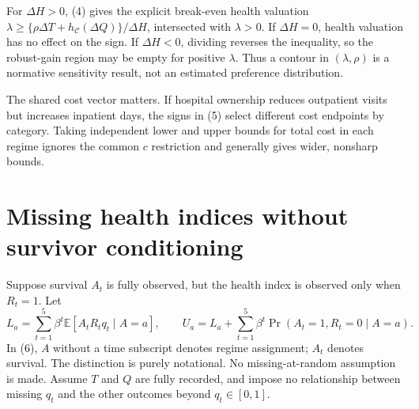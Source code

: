 \documentclass[11pt]{article}
\theoremstyle{remark}
\newcommand{\E}{\mathbb E}
\begin{document}
For $\Delta H>0$, (4) gives the explicit break-even health valuation
$\lambda\geq\{\rho\Delta T+h_{\mathcal C}(\Delta Q)\}/\Delta H$,
intersected with $\lambda>0$. If $\Delta H=0$, health valuation has no effect on the sign. If $\Delta H<0$, dividing reverses the inequality, so the robust-gain region may be empty for positive $\lambda$. Thus a contour in $(\lambda,\rho)$ is a normative sensitivity result, not an estimated preference distribution.

The shared cost vector matters. If hospital ownership reduces outpatient visits but increases inpatient days, the signs in (5) select different cost endpoints by category. Taking independent lower and upper bounds for total cost in each regime ignores the common $c$ restriction and generally gives wider, nonsharp bounds.

\section{Missing health indices without survivor conditioning}
Suppose survival $A_t$ is fully observed, but the health index is observed only when $R_t=1$. Let
\[
 L_a=\sum_{t=1}^5\beta^t\E[A_tR_tq_t\mid A=a],\qquad
 U_a=L_a+\sum_{t=1}^5\beta^t\Pr(A_t=1,R_t=0\mid A=a).     \tag{6}
\]
In (6), $A$ without a time subscript denotes regime assignment; $A_t$ denotes survival. The distinction is purely notational. No missing-at-random assumption is made. Assume $T$ and $Q$ are fully recorded, and impose no relationship between missing $q_t$ and the other outcomes beyond $q_t\in[0,1]$.
\end{document}
